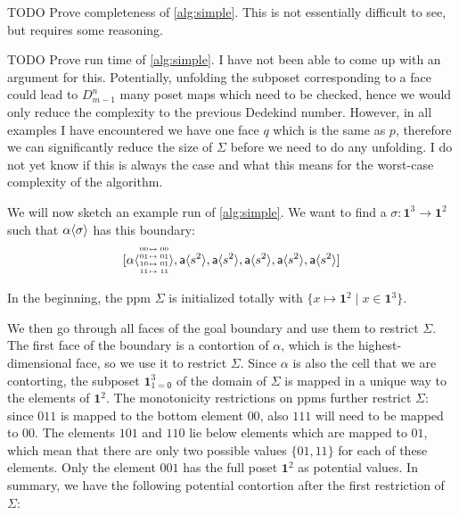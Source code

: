 \documentclass{llncs}
\newcommand{\continuation}{??}
\newenvironment{examplecontd}[1]
{\renewcommand{\continuation}{\ref{#1}}\expcont[continued]}
{\endexpcont}
\newcommand{\todo}[1]{
  \begin{tcolorbox}
    TODO {#1} 
  \end{tcolorbox}
}
\newcommand{\mlist}[1]{[ {#1} ]}
\newcommand{\pint}[1]{\mathbf{1}^{#1}}
\newcommand{\pintrestr}[3]{\mathbf{1}^{#1}_{{#2}={#3}}}
\newcommand{\izero}{\mathsf{0}}
\newcommand{\smap}[1]{s^{{#1}}}
\newcommand{\cont}[2]{\ensuremath{ \ifthenelse{\equal{#2}{}}{#1}{{#1}\langle{#2}\rangle}} }
\newcommand{\cset}[1]{\ensuremath{\mathsf{{#1}}}}
\newcommand{\substfour}[4]{\tiny
  \arraycolsep=.4pt\def\arraystretch{1}
  \begin{array}{ll}
    00 &\mapsto {#1} \\
    01 &\mapsto {#2} \\
    10 &\mapsto {#3} \\
    11 &\mapsto {#4} 
  \end{array}
}
\begin{document}
\begin{proposition}



\todo{Prove completeness of \autoref{alg:simple}. This is not essentially difficult to
  see, but requires some reasoning.}

\todo{Prove run time of \autoref{alg:simple}. I have not been able to come up
  with an argument for this. Potentially, unfolding the subposet corresponding
  to a face could lead to $D_{m-1}^n$ many poset maps which need to be checked,
  hence we would only reduce the complexity to the previous Dedekind number.
  However, in all examples I have encountered we have one face $q$ which is the
  same as $p$, therefore we can significantly reduce the size of $\Sigma$ before
we need to do any unfolding. I do not yet know if this is always the case and
what this means for the worst-case complexity of the algorithm. }


\begin{examplecontd}{exp:sndsphere}

  We will now sketch an example run of \autoref{alg:simple}. We want to find a
  $\sigma : \pint{3} \to \pint{2}$ such that $\cont{\alpha}{\sigma}$ has this boundary:
$$\mlist{ \cont{\cset{\alpha}}{\substfour{00}{01}{01}{11}} ,
  \cont{\cset{a}}{\smap{2}} , \cont{\cset{a}}{\smap{2}} ,
  \cont{\cset{a}}{\smap{2}} , \cont{\cset{a}}{\smap{2}} ,
  \cont{\cset{a}}{\smap{2}}}$$

In the beginning, the ppm $\Sigma$ is initialized totally with $\{ x \mapsto
\pint{2} \mid x \in \pint{3}\}$.

We then go through all faces of the goal boundary and use them to restrict
$\Sigma$.
The first face of the boundary is a contortion of $\alpha$, which is the
highest-dimensional face, so we use it to restrict $\Sigma$. Since $\alpha$ is also
the cell that we are contorting, the subposet $\pintrestr{3}{1}{\izero}$
of the domain of $\Sigma$
is mapped in a unique way to the elements of $\pint{2}$. The monotonicity
restrictions on ppms further restrict $\Sigma$: since $011$ is mapped to the
bottom element $00$, also $111$ will need to be mapped to $00$. The elements
$101$ and $110$ lie below elements which are mapped to $01$, which mean that
there are only two possible values $\{01, 11\}$ for each of these elements. Only
the element $001$ has the full poset $\pint{2}$ as potential values. In summary,
we have the following potential contortion after the first restriction of $\Sigma$:


\end{examplecontd}
\end{proposition}
\end{document}

